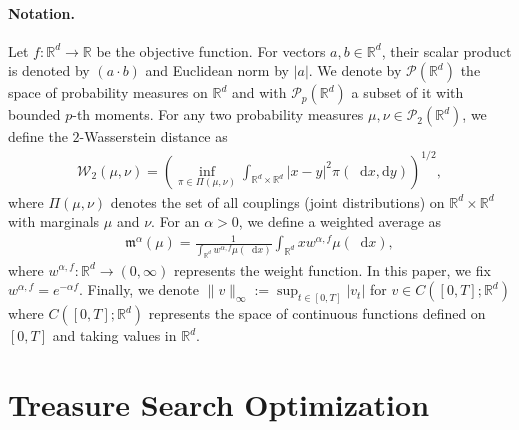 \documentclass{article}
\def\R{\mathbb{R}}
\def\m{\mathfrak{m}}
\newcommand*\der{\mathop{}\!\mathrm{d}}
\numberwithin{equation}{section}
\begin{document}
\paragraph{Notation.} Let $f : \mathbb{R}^{d} \to \mathbb{R}$ be the objective function. For vectors $a, b \in \mathbb{R}^d$, their scalar product is denoted by $(a \cdot b)$ and Euclidean norm by $|a|$. We denote by $\mathcal{P}(\mathbb{R}^{d})$ the space of probability measures on $\mathbb{R}^d$ and with $\mathcal{P}_p(\mathbb{R}^d)$ a subset of it with bounded $p$-th moments. For any two probability measures $\mu, \nu \in \mathcal{P}_2(\mathbb{R}^d)$, we define the $2$-Wasserstein distance as
\begin{align}
    \mathcal{W}_2(\mu, \nu) = \left( \inf_{\pi \in \Pi(\mu, \nu)} \int_{\mathbb{R}^d \times \mathbb{R}^d} |x - y|^2 \pi(\der x, \mathrm{d}y) \right)^{1/2},
\end{align}
where $\Pi(\mu, \nu)$ denotes the set of all couplings (joint distributions) on $\mathbb{R}^d \times \mathbb{R}^d$ with marginals $\mu$ and $\nu$.  For an $\alpha > 0$, we define a weighted average as
\begin{align}
   \m^\alpha(\mu) =  \frac{1}{\int_{\mathbb{R}^d} w^{\alpha, f} \mu(\der x)} \int_{\R^d} x w^{\alpha, f} \mu(\der x), 
\end{align}
where $w^{\alpha, f} : \mathbb{R}^{d} \rightarrow (0,\infty)$ represents the weight function. In this paper, we fix $w^{\alpha , f} = e^{-\alpha f} $. 
Finally, we denote $\|v\|_\infty := \sup_{t \in [0,T]} |v_t| $ for $v \in C([0,T];\mathbb{R}^d)$ where $C([0,T];\mathbb{R}^d)$ represents the space of continuous functions defined on $[0,T]$ and taking values in $\mathbb{R}^d$.




\section{Treasure Search Optimization}\label{tso_section_2}
\end{document}
